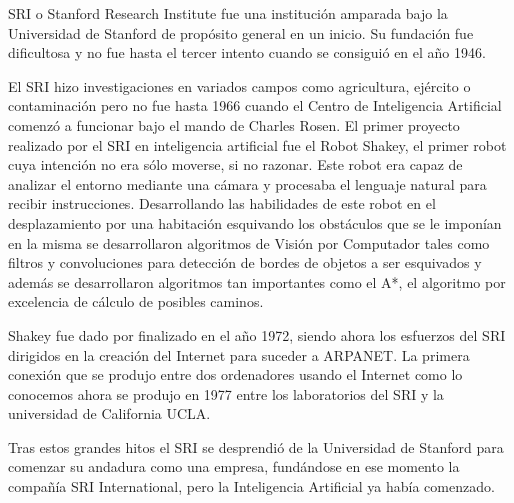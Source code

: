 SRI o Stanford Research Institute fue una institución amparada bajo la Universidad de Stanford de propósito general en un inicio. Su fundación fue dificultosa y no fue hasta el tercer intento cuando se consiguió en el año 1946.

\vspace{10px}

El SRI hizo investigaciones en variados campos como agricultura, ejército o contaminación pero no fue hasta 1966 cuando el Centro de Inteligencia Artificial comenzó a funcionar bajo el mando de Charles Rosen. El primer proyecto realizado por el SRI en inteligencia artificial fue el Robot Shakey, el primer robot cuya intención no era sólo moverse, si no razonar. Este robot era capaz de analizar el entorno mediante una cámara y procesaba el lenguaje natural para recibir instrucciones. Desarrollando las habilidades de este robot en el desplazamiento por una habitación esquivando los obstáculos que se le imponían en la misma se desarrollaron algoritmos de Visión por Computador tales como filtros y convoluciones para detección de bordes de objetos a ser esquivados y además se desarrollaron algoritmos tan importantes como el A*, el algoritmo por excelencia de cálculo de posibles caminos.

\vspace{10px}

Shakey fue dado por finalizado en el año 1972, siendo ahora los esfuerzos del SRI dirigidos en la creación del Internet para suceder a ARPANET. La primera conexión que se produjo entre dos ordenadores usando el Internet como lo conocemos ahora se produjo en 1977 entre los laboratorios del SRI y la universidad de California UCLA.

\vspace{10px}

Tras estos grandes hitos el SRI se desprendió de la Universidad de Stanford para comenzar su andadura como una empresa, fundándose en ese momento la compañía SRI International, pero la Inteligencia Artificial ya había comenzado.
